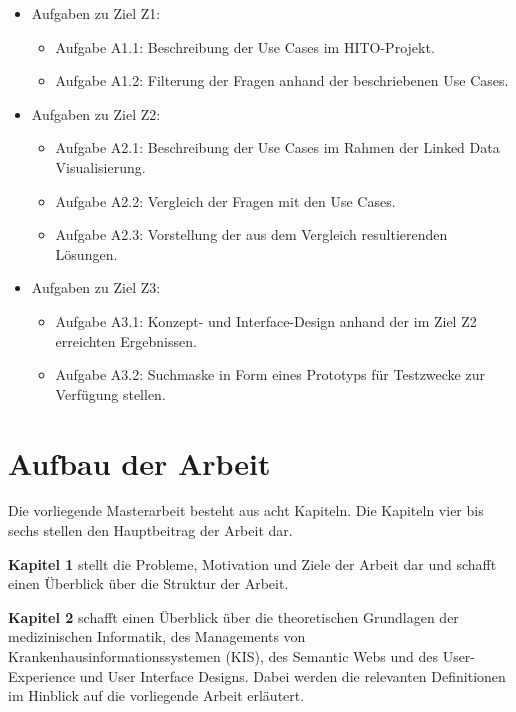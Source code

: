 \begin{itemize}
\item Aufgaben zu Ziel Z1:
	\begin{itemize}
	\item Aufgabe A1.1: Beschreibung der Use Cases im HITO-Projekt.
	\item Aufgabe A1.2: Filterung der Fragen anhand der beschriebenen Use Cases.
	\end{itemize}
\item Aufgaben zu Ziel Z2:
	\begin{itemize}
	\item Aufgabe A2.1: Beschreibung der Use Cases im Rahmen der Linked Data Visualisierung.
	\item Aufgabe A2.2: Vergleich der Fragen mit den Use Cases.
	\item Aufgabe A2.3: Vorstellung der aus dem Vergleich resultierenden Lösungen.
	\end{itemize}
\item Aufgaben zu Ziel Z3:
	\begin{itemize}
	\item Aufgabe A3.1: Konzept- und Interface-Design anhand der im Ziel Z2 erreichten Ergebnissen.
	\item Aufgabe A3.2: Suchmaske in Form eines Prototyps für Testzwecke zur Verfügung stellen.
	\end{itemize}
\end{itemize}

\section{Aufbau der Arbeit}\label{sec:aufbau}

Die vorliegende Masterarbeit besteht aus acht Kapiteln. Die Kapiteln vier bis sechs stellen den Hauptbeitrag der Arbeit dar. \newline

\textbf{Kapitel 1} stellt die Probleme, Motivation und Ziele der Arbeit dar und schafft einen Überblick über die Struktur der Arbeit. \newline

\textbf{Kapitel 2} schafft einen Überblick über die theoretischen Grundlagen der medizinischen Informatik, des Managements von Krankenhausinformationssystemen (KIS), des Semantic Webs und des User-Experience und User Interface Designs. Dabei werden die relevanten Definitionen im Hinblick auf die vorliegende Arbeit erläutert.  \newline

